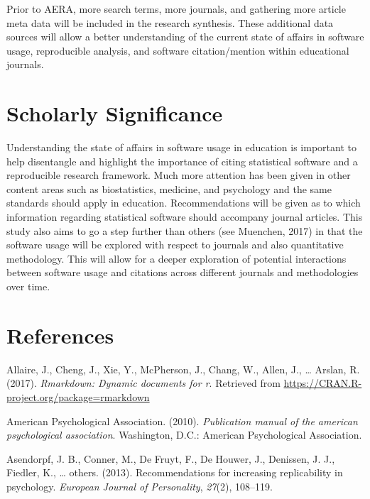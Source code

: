 \documentclass[english,man]{apa6}
\theoremstyle{definition}
\theoremstyle{definition}
\theoremstyle{remark}
\begin{document}
Prior to AERA, more search terms, more journals, and gathering more
article meta data will be included in the research synthesis. These
additional data sources will allow a better understanding of the current
state of affairs in software usage, reproducible analysis, and software
citation/mention within educational journals.

\section{Scholarly Significance}\label{scholarly-significance}

Understanding the state of affairs in software usage in education is
important to help disentangle and highlight the importance of citing
statistical software and a reproducible research framework. Much more
attention has been given in other content areas such as biostatistics,
medicine, and psychology and the same standards should apply in
education. Recommendations will be given as to which information
regarding statistical software should accompany journal articles. This
study also aims to go a step further than others (see Muenchen, 2017) in
that the software usage will be explored with respect to journals and
also quantitative methodology. This will allow for a deeper exploration
of potential interactions between software usage and citations across
different journals and methodologies over time.

\section{References}\label{references}

\setlength{\parindent}{-0.5in} \setlength{\leftskip}{0.5in}

\hypertarget{refs}{}
\hypertarget{ref-rmarkdown}{}
Allaire, J., Cheng, J., Xie, Y., McPherson, J., Chang, W., Allen, J.,
\ldots{} Arslan, R. (2017). \emph{Rmarkdown: Dynamic documents for r}.
Retrieved from \url{https://CRAN.R-project.org/package=rmarkdown}

\hypertarget{ref-apa}{}
American Psychological Association. (2010). \emph{Publication manual of
the american psychological association}. Washington, D.C.: American
Psychological Association.

\hypertarget{ref-asendorpf2013}{}
Asendorpf, J. B., Conner, M., De Fruyt, F., De Houwer, J., Denissen, J.
J., Fiedler, K., \ldots{} others. (2013). Recommendations for increasing
replicability in psychology. \emph{European Journal of Personality},
\emph{27}(2), 108--119.
\end{document}
